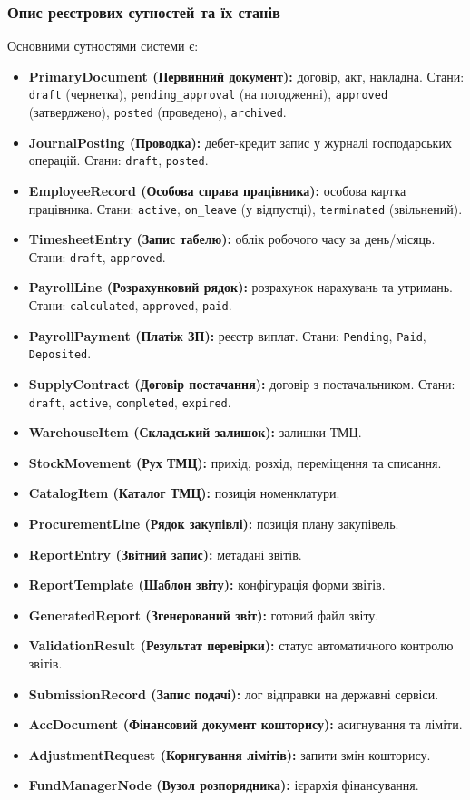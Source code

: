 \documentclass{article}
\begin{document}
\subsubsection{Опис реєстрових сутностей та їх станів}
Основними сутностями системи є:
\begin{itemize}
    \item \textbf{PrimaryDocument (Первинний документ):} договір, акт, накладна. Стани: \texttt{draft} (чернетка), \texttt{pending\_approval} (на погодженні), \texttt{approved} (затверджено), \texttt{posted} (проведено), \texttt{archived}.
    \item \textbf{JournalPosting (Проводка):} дебет-кредит запис у журналі господарських операцій. Стани: \texttt{draft}, \texttt{posted}.
    \item \textbf{EmployeeRecord (Особова справа працівника):} особова картка працівника. Стани: \texttt{active}, \texttt{on\_leave} (у відпустці), \texttt{terminated} (звільнений).
    \item \textbf{TimesheetEntry (Запис табелю):} облік робочого часу за день/місяць. Стани: \texttt{draft}, \texttt{approved}.
    \item \textbf{PayrollLine (Розрахунковий рядок):} розрахунок нарахувань та утримань. Стани: \texttt{calculated}, \texttt{approved}, \texttt{paid}.
    \item \textbf{PayrollPayment (Платіж ЗП):} реєстр виплат. Стани: \texttt{Pending}, \texttt{Paid}, \texttt{Deposited}.
    \item \textbf{SupplyContract (Договір постачання):} договір з постачальником. Стани: \texttt{draft}, \texttt{active}, \texttt{completed}, \texttt{expired}.
    \item \textbf{WarehouseItem (Складський залишок):} залишки ТМЦ.
    \item \textbf{StockMovement (Рух ТМЦ):} прихід, розхід, переміщення та списання.
    \item \textbf{CatalogItem (Каталог ТМЦ):} позиція номенклатури.
    \item \textbf{ProcurementLine (Рядок закупівлі):} позиція плану закупівель.
    \item \textbf{ReportEntry (Звітний запис):} метадані звітів.
    \item \textbf{ReportTemplate (Шаблон звіту):} конфігурація форми звітів.
    \item \textbf{GeneratedReport (Згенерований звіт):} готовий файл звіту.
    \item \textbf{ValidationResult (Результат перевірки):} статус автоматичного контролю звітів.
    \item \textbf{SubmissionRecord (Запис подачі):} лог відправки на державні сервіси.
    \item \textbf{AccDocument (Фінансовий документ кошторису):} асигнування та ліміти.
    \item \textbf{AdjustmentRequest (Коригування лімітів):} запити змін кошторису.
    \item \textbf{FundManagerNode (Вузол розпорядника):} ієрархія фінансування.
\end{itemize}
\end{document}
